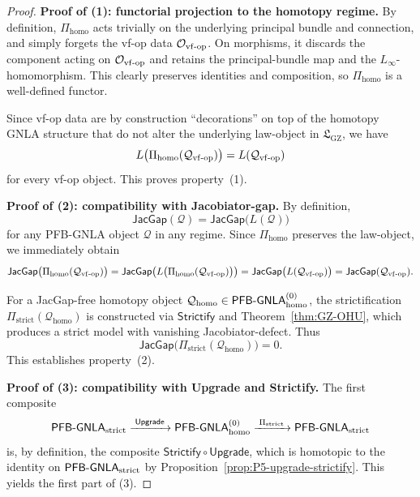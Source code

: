 \documentclass[11pt]{book}
\theoremstyle{plain}
\theoremstyle{definition}
\newcommand{\GZLS}{\ensuremath{\mathfrak{L}_{\mathrm{GZ}}}}       \newcommand{\GZLT}{\ensuremath{M_{!w}}}                           \newcommand{\GZLOC}{\ensuremath{A_M}}                             \newcommand{\GZLCurv}{\ensuremath{\mathcal{F}_{\mathrm{law}}}}
\begin{document}
\begin{proof}
\textbf{Proof of (1): functorial projection to the homotopy regime.}
By definition, \(\Pi_{\mathrm{homo}}\) acts trivially on the underlying
principal bundle and connection, and simply forgets the vf-op data
\(\mathcal{O}_{\mathrm{vf\text- op}}\).  On morphisms, it discards the
component acting on \(\mathcal{O}_{\mathrm{vf\text- op}}\) and retains
the principal-bundle map and the \(L_\infty\)-homomorphism.  This
clearly preserves identities and composition, so
\(\Pi_{\mathrm{homo}}\) is a well-defined functor.

Since vf-op data are by construction “decorations” on top of the
homotopy GNLA structure that do not alter the underlying law-object in
\(\GZLS\), we have
\[
  L\bigl(\Pi_{\mathrm{homo}}(\mathcal{Q}_{\mathrm{vf\text- op}})\bigr)
  =
  L(\mathcal{Q}_{\mathrm{vf\text- op}})
\]
for every vf-op object.  This proves property~\textnormal{(1)}.



\medskip\noindent
\textbf{Proof of (2): compatibility with Jacobiator-gap.}
By definition,
\[
  \mathsf{JacGap}(\mathcal{Q})
  =
  \mathsf{JacGap}\bigl(L(\mathcal{Q})\bigr)
\]
for any PFB-GNLA object \(\mathcal{Q}\) in any regime.  Since
\(\Pi_{\mathrm{homo}}\) preserves the law-object, we immediately obtain
\[
  \mathsf{JacGap}\bigl(
    \Pi_{\mathrm{homo}}(\mathcal{Q}_{\mathrm{vf\text- op}})
  \bigr)
  =
  \mathsf{JacGap}\bigl(
    L\bigl(\Pi_{\mathrm{homo}}(\mathcal{Q}_{\mathrm{vf\text- op}})\bigr)
  \bigr)
  =
  \mathsf{JacGap}\bigl(L(\mathcal{Q}_{\mathrm{vf\text- op}})\bigr)
  =
  \mathsf{JacGap}(\mathcal{Q}_{\mathrm{vf\text- op}}).
\]

For a JacGap-free homotopy object
\(\mathcal{Q}_{\mathrm{homo}}\in
 \mathsf{PFB\text- GNLA}_{\mathrm{homo}}^{(0)}\), the strictification\\
\(\Pi_{\mathrm{strict}}(\mathcal{Q}_{\mathrm{homo}})\) is constructed
via \(\mathsf{Strictify}\) and Theorem~\ref{thm:GZ-OHU}, which
produces a strict model with vanishing Jacobiator-defect.  Thus
\[
  \mathsf{JacGap}\bigl(
    \Pi_{\mathrm{strict}}(\mathcal{Q}_{\mathrm{homo}})
  \bigr)
  = 0.
\]
This establishes property~\textnormal{(2)}.



\medskip\noindent
\textbf{Proof of (3): compatibility with Upgrade and Strictify.}
The first composite
\[
  \mathsf{PFB\text- GNLA}_{\mathrm{strict}}
  \xrightarrow{\;\mathsf{Upgrade}\;}
  \mathsf{PFB\text- GNLA}_{\mathrm{homo}}^{(0)}
  \xrightarrow{\;\Pi_{\mathrm{strict}}\;}
  \mathsf{PFB\text- GNLA}_{\mathrm{strict}}
\]
is, by definition, the composite
\(\mathsf{Strictify}\circ\mathsf{Upgrade}\), which is homotopic to
the identity on \(\mathsf{PFB\text- GNLA}_{\mathrm{strict}}\) by
Proposition~\ref{prop:P5-upgrade-strictify}.  This yields the first
part of \textnormal{(3)}.


\end{proof}
\end{document}
